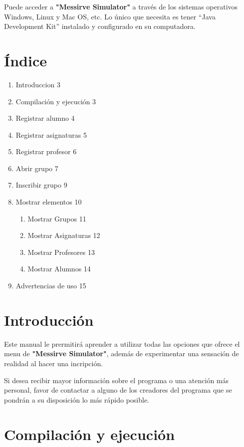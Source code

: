 \documentclass[12pt]{report}
\begin{document}
Puede acceder a \textbf{"Messirve Simulator"} a través de los sistemas operativos Windows, Linux y Mac OS, etc. Lo único que necesita es tener ``Java Development Kit'' instalado y configurado en su computadora.


\section*{Índice}
\begin{enumerate}
    \item Introduccion \hfill 3
    \item Compilación y ejecución \hfill 3
    \item Registrar alumno \hfill 4
    \item Registrar asignaturas \hfill 5
    \item Registrar profesor \hfill 6
    \item Abrir grupo \hfill 7
    \item Inscribir grupo \hfill 9
    \item Mostrar elementos \hfill 10
    \begin{enumerate}
        \item Mostrar Grupos \hfill 11
        \item Mostrar Asignaturas \hfill 12
        \item Mostrar Profesores \hfill 13
        \item Mostrar Alumnos \hfill 14
    \end{enumerate}
    \item Advertencias de uso \hfill 15
\end{enumerate}

\newpage %

\section*{Introducción}
Este manual le prermitirá aprender a utilizar todas las opciones que ofrece el menu de \textbf{"Messirve Simulator"}, además de experimentar una sensación de realidad al hacer una incripción.

\vspace{0.5cm}
Si desea recibir mayor información sobre el programa o una atención más personal, favor de contactar a alguno de los creadores del programa que se pondrán a su disposición lo más rápido posible.




\section*{Compilación y ejecución}
\end{document}
